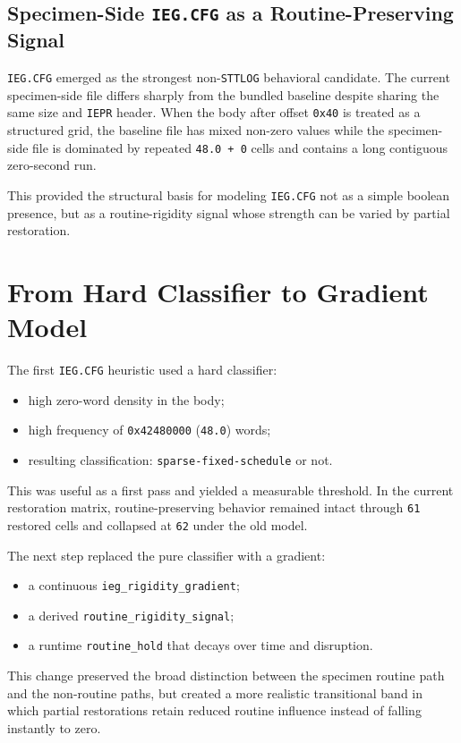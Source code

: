 \documentclass[11pt]{article}
\begin{document}
\subsection{Specimen-Side \texttt{IEG.CFG} as a Routine-Preserving Signal}
\texttt{IEG.CFG} emerged as the strongest non-\texttt{STTLOG} behavioral
candidate. The current specimen-side file differs sharply from the bundled
baseline despite sharing the same size and \texttt{IEPR} header. When the body
after offset \texttt{0x40} is treated as a structured grid, the baseline file
has mixed non-zero values while the specimen-side file is dominated by
repeated \texttt{48.0 + 0} cells and contains a long contiguous zero-second run.

This provided the structural basis for modeling \texttt{IEG.CFG} not as a
simple boolean presence, but as a routine-rigidity signal whose strength can be
varied by partial restoration.

\section{From Hard Classifier to Gradient Model}
The first \texttt{IEG.CFG} heuristic used a hard classifier:
\begin{itemize}[leftmargin=*]
\item high zero-word density in the body;
\item high frequency of \texttt{0x42480000} (\texttt{48.0}) words;
\item resulting classification: \texttt{sparse-fixed-schedule} or not.
\end{itemize}

This was useful as a first pass and yielded a measurable threshold. In the
current restoration matrix, routine-preserving behavior remained intact through
\texttt{61} restored cells and collapsed at \texttt{62} under the old model.

The next step replaced the pure classifier with a gradient:
\begin{itemize}[leftmargin=*]
\item a continuous \texttt{ieg\_rigidity\_gradient};
\item a derived \texttt{routine\_rigidity\_signal};
\item a runtime \texttt{routine\_hold} that decays over time and disruption.
\end{itemize}

This change preserved the broad distinction between the specimen routine path
and the non-routine paths, but created a more realistic transitional band in
which partial restorations retain reduced routine influence instead of falling
instantly to zero.
\end{document}
